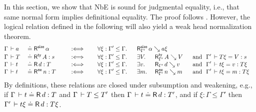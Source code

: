 \documentclass[acmlarge,review,anonymous]{acmart}\settopmatter{printfolios=true}
\begin{document}
In this section, we show that NbE is sound for judgmental equality, i.e., that same normal form implies definitional equality.  The proof follows \citet{abelCoquandDybjer:lics07,abel:habil}.  However, the logical relation defined in the following will also yield a weak head normalization theorem.
\begin{alignat*}{8}
& \Gamma \der a && \doteq \tRsize\, \alpha
  && \quad\defas\quad
  && \forall \xi : \Gamma' \leq \Gamma.\ \
  && \mathrlap{ \RSize {\Gamma'} \alpha {a\xi} }
\\[-0.6ex]
& \Gamma \der T && \doteq \tRty\, A  : s
  && \quad\defas\quad
  && \forall \xi : \Gamma' \leq \Gamma.\ \
  && \exists V.\
  && \RTy{\Gamma'} A V
  && ~\mand~ \Gamma' \der T\xi = V : s
\\[-0.6ex]
& \Gamma \der t && \doteq \tR\, d  : T
  && \quad\defas\quad
  && \forall \xi : \Gamma' \leq \Gamma.\ \
  && \exists v.\
  && \R{\Gamma'} d v
  && ~\mand~ \Gamma' \der t\xi = v : T\xi
\\[-0.6ex]
& \Gamma \der t && \doteq \tRne\, n  : T
  && \quad\defas\quad
  && \forall \xi : \Gamma' \leq \Gamma.\ \
  && \exists m.\
  && \RNe{\Gamma'} n m
  && ~\mand~ \Gamma' \der t\xi = m : T\xi
\end{alignat*}
By definitions, these relations are closed under subsumption and
weakening, e.g., if\/ $\Gamma \,\vdash t \doteq \mathsf{R}\, d : T$ and $\Gamma \,\vdash T \leq T'$ then $\Gamma \,\vdash t \doteq \mathsf{R}\, d : T'$,
and if\/ $\xi : \Gamma \leq \Gamma'$ then $\Gamma' \,\vdash t\xi \doteq \mathsf{R}\, d : T\xi$.
\end{document}
